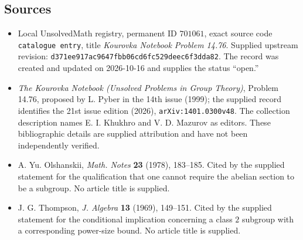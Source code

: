 \documentclass[11pt]{article}
\begin{document}
\subsection{Sources}
\begin{itemize}
\item Local UnsolvedMath registry, permanent ID \(701061\), exact source code \texttt{catalogue entry}, title \emph{Kourovka Notebook Problem 14.76}. Supplied upstream revision: \texttt{d371ee917ac9647fbb06cd6fc529deec6f3dda82}. The record was created and updated on 2026-10-16 and supplies the status ``open.''
\item \emph{The Kourovka Notebook (Unsolved Problems in Group Theory)}, Problem 14.76, proposed by L. Pyber in the 14th issue (1999); the supplied record identifies the 21st issue edition (2026), \texttt{arXiv:1401.0300v48}. The collection description names E. I. Khukhro and V. D. Mazurov as editors. These bibliographic details are supplied attribution and have not been independently verified.
\item A. Yu. Olshanskii, \emph{Math. Notes} \textbf{23} (1978), 183--185. Cited by the supplied statement for the qualification that one cannot require the abelian section to be a subgroup. No article title is supplied.
\item J. G. Thompson, \emph{J. Algebra} \textbf{13} (1969), 149--151. Cited by the supplied statement for the conditional implication concerning a class \(2\) subgroup with a corresponding power-size bound. No article title is supplied.
\end{itemize}
\end{document}
